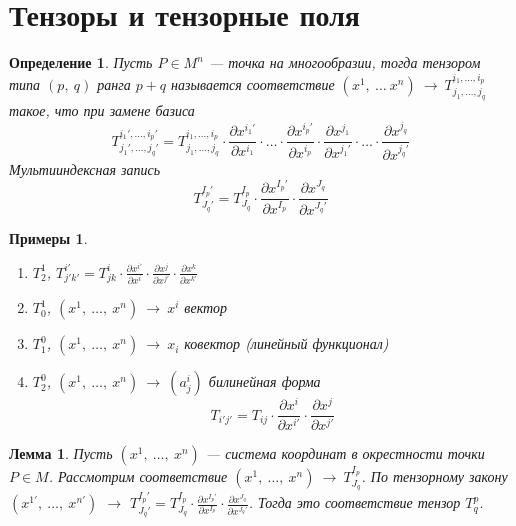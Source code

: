\documentclass[12pt]{article}
\newcommand\tab[1][.5cm]{\hspace*{#1}}
\theoremstyle{plain}
\newtheorem{lemma}{Лемма}[section]
\newtheorem{examples}{Примеры}
\newtheorem{definition}{Определение}[section]
\begin{document}
    \tableofcontents
    \fontsize{14pt}{20pt}\selectfont
    \newpage
    \section{Тензоры и тензорные поля}
    \begin{definition}
        Пусть $P\in M^n$ --- точка на многообразии, тогда тензором типа $(p, \ q)$ ранга $p+q$ называется соответствие $(x^1, \ \ldots \ x^n) \ \longrightarrow \ T^{i_1,\ldots,i_p}_{j_1,\ldots,j_q}$ такое, что при замене базиса
        $$T^{i_1',\ldots,i_p'}_{j_1',\ldots,j_q'}=T^{i_1,\ldots,i_p}_{j_1,\ldots,j_q}\cdot\frac{\partial x^{i_1'}}{\partial x^{i_1}}\cdot\ldots\cdot\frac{\partial x^{i_p'}}{\partial x^{i_p}}\cdot\frac{\partial x^{j_1}}{\partial x^{j_1'}}\cdot\ldots\cdot\frac{\partial x^{j_q}}{\partial x^{j_q'}}$$
        Мультииндексная запись
        $$T_{J_q'}^{I_p'}=T_{J_q}^{I_p}\cdot\frac{\partial x^{I_p'}}{\partial x^{I_p}}\cdot\frac{\partial x^{J_q}}{\partial x^{J_q'}}$$
    \end{definition}
    \begin{examples}\tab
        \begin{enumerate}
            \item $T_2^1$, $T^{i'}_{j'k'}=T_{jk}^i\cdot\frac{\partial x^{i'}}{\partial x^{i}}\cdot\frac{\partial x^{j}}{\partial x^{j'}}\cdot\frac{\partial x^{k}}{\partial x^{k'}}$
            \item $T_0^1$, $(x^1, \ \ldots, \ x^n) \ \longrightarrow \ x^i$ вектор
            \item $T_1^0$, $(x^1, \ \ldots, \ x^n) \ \longrightarrow \ x_i$ ковектор (линейный функционал)
            \item $T_2^0$, $(x^1, \ \ldots, \ x^n) \ \longrightarrow \ (a^i_j)$ билинейная форма
            $$T_{i'j'}=T_{ij}\cdot\frac{\partial x^{i}}{\partial x^{i'}}\cdot\frac{\partial x^{j}}{\partial x^{j'}}$$
        \end{enumerate}
    \end{examples}
    \begin{lemma}
        Пусть $(x^1, \ \ldots, \ x^n)$ --- система координат в окрестности точки $P\in M$. Рассмотрим соответствие $(x^1, \ \ldots, \ x^n) \ \longrightarrow \ T^{I_p}_{J_q}$. По тензорному закону\\
        $(x^{1'}, \ \ldots, \ x^{n'})$ $\longrightarrow$ $T^{I_p'}_{J_q'}=T^{I_p}_{J_q}\cdot\frac{\partial x^{I_p'}}{\partial x^{I_p}}\cdot\frac{\partial x^{J_q}}{\partial x^{J_q'}}$. Тогда это соответствие тензор $T_q^p$.
    \end{lemma}
\end{document}
